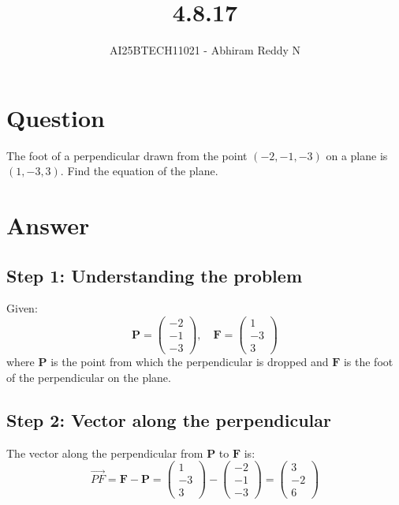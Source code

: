 \documentclass[journal]{IEEEtran}
\begin{document}

\vspace{3cm}

\title{4.8.17}
\author{AI25BTECH11021 - Abhiram Reddy N}
{\let\newpage\relax\maketitle}

\renewcommand{\thefigure}{\theenumi}
\renewcommand{\thetable}{\theenumi}
\setlength{\intextsep}{10pt} %


\renewcommand{\thetable}{\theenumi}


\section*{Question}
The foot of a perpendicular drawn from the point \((-2, -1, -3)\) on a plane is \((1, -3, 3)\). Find the equation of the plane.

\section*{Answer}

\subsection*{\textbf{Step 1}: Understanding the problem}
Given:
\[
\mathbf{P} = \begin{pmatrix} -2 \\ -1 \\ -3 \end{pmatrix}, \quad
\mathbf{F} = \begin{pmatrix} 1 \\ -3 \\ 3 \end{pmatrix}
\]
where \(\mathbf{P}\) is the point from which the perpendicular is dropped and \(\mathbf{F}\) is the foot of the perpendicular on the plane.

\subsection*{\textbf{Step 2}: Vector along the perpendicular}
The vector along the perpendicular from \(\mathbf{P}\) to \(\mathbf{F}\) is:
\[
\vec{PF} = \mathbf{F} - \mathbf{P} = \begin{pmatrix} 1 \\ -3 \\ 3 \end{pmatrix} - \begin{pmatrix} -2 \\ -1 \\ -3 \end{pmatrix} = \begin{pmatrix} 3 \\ -2 \\ 6 \end{pmatrix}
\]
\end{document}
